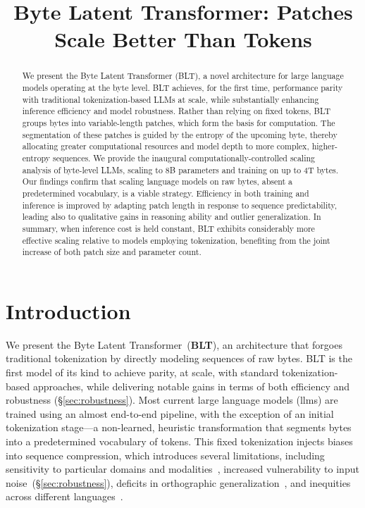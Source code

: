 \title{Byte Latent Transformer: Patches Scale Better Than Tokens}

\begin{abstract}
We present the Byte Latent Transformer ({\textsc BLT}), a novel architecture for large language models operating at the byte level. {\textsc BLT} achieves, for the first time, performance parity with traditional tokenization-based LLMs at scale, while substantially enhancing inference efficiency and model robustness. Rather than relying on fixed tokens, {\textsc BLT} groups bytes into variable-length patches, which form the basis for computation. The segmentation of these patches is guided by the entropy of the upcoming byte, thereby allocating greater computational resources and model depth to more complex, higher-entropy sequences. We provide the inaugural computationally-controlled scaling analysis of byte-level LLMs, scaling to 8B parameters and training on up to 4T bytes. Our findings confirm that scaling language models on raw bytes, absent a predetermined vocabulary, is a viable strategy. Efficiency in both training and inference is improved by adapting patch length in response to sequence predictability, leading also to qualitative gains in reasoning ability and outlier generalization. In summary, when inference cost is held constant, {\textsc BLT} exhibits considerably more effective scaling relative to models employing tokenization, benefiting from the joint increase of both patch size and parameter count.
\end{abstract}

\section{Introduction}
\label{section:intro}

We present the Byte Latent Transformer~(\textbf{BLT}), an architecture that forgoes traditional tokenization by directly modeling sequences of raw bytes. BLT is the first model of its kind to achieve parity, at scale, with standard tokenization-based approaches, while delivering notable gains in terms of both efficiency and robustness (\S\ref{sec:robustness}).
Most current large language models (llms) are trained using an almost end-to-end pipeline, with the exception of an initial tokenization stage—a non-learned, heuristic transformation that segments bytes into a predetermined vocabulary of tokens. This fixed tokenization injects biases into sequence compression, which introduces several limitations, including sensitivity to particular domains and modalities~\citep{dagangetting}, increased vulnerability to input noise~(\S\ref{sec:robustness}), deficits in orthographic generalization~\citep{edman2024cute}, and inequities across different languages~\citep{liang2023xlm,petrov2024language,limisiewicz2024myte}.

